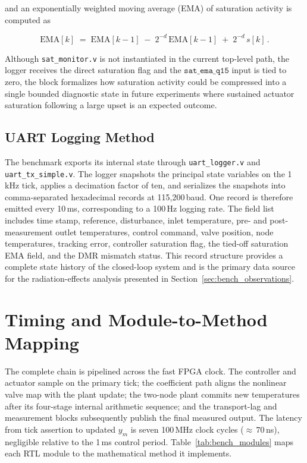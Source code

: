and an exponentially weighted moving average (EMA) of saturation
activity is computed as

\begin{equation}
  \mathrm{EMA}[k] \;=\; \mathrm{EMA}[k-1]
    \;-\; 2^{-d}\,\mathrm{EMA}[k-1]
    \;+\; 2^{-d}\,s[k] \,.
  \label{eq:sat_ema}
\end{equation}

Although \texttt{sat\_monitor.v} is not instantiated in the current
top-level path, the logger receives the direct saturation flag and the
$\texttt{sat\_ema\_q15}$ input is tied to zero, the block formalizes
how saturation activity could be compressed into a single bounded
diagnostic state in future experiments where sustained actuator
saturation following a large upset is an expected outcome.

\subsection{UART Logging Method}
\label{ssec:bench_uart}

The benchmark exports its internal state through \texttt{uart\_logger.v}
and \texttt{uart\_tx\_simple.v}.  The logger snapshots the principal
state variables on the 1\,kHz tick, applies a decimation factor of ten,
and serializes the snapshots into comma-separated hexadecimal records at
115{,}200\,baud.  One record is therefore emitted every 10\,ms,
corresponding to a 100\,Hz logging rate.  The field list includes time
stamp, reference, disturbance, inlet temperature, pre- and
post-measurement outlet temperatures, control command, valve position,
node temperatures, tracking error, controller saturation flag, the
tied-off saturation EMA field, and the DMR mismatch status.  This record
structure provides a complete state history of the closed-loop system
and is the primary data source for the radiation-effects analysis
presented in Section~\ref{sec:bench_observations}.

\section{Timing and Module-to-Method Mapping}
\label{sec:bench_timing}

The complete chain is pipelined across the fast FPGA clock.  The
controller and actuator sample on the primary tick; the coefficient path
aligns the nonlinear valve map with the plant update; the two-node plant
commits new temperatures after its four-stage internal arithmetic
sequence; and the transport-lag and measurement blocks subsequently
publish the final measured output.  The latency from tick assertion to
updated $y_m$ is seven 100\,MHz clock cycles (${\approx}\,70$\,ns),
negligible relative to the 1\,ms control period.  Table~\ref{tab:bench_modules}
maps each RTL module to the mathematical method it implements.

